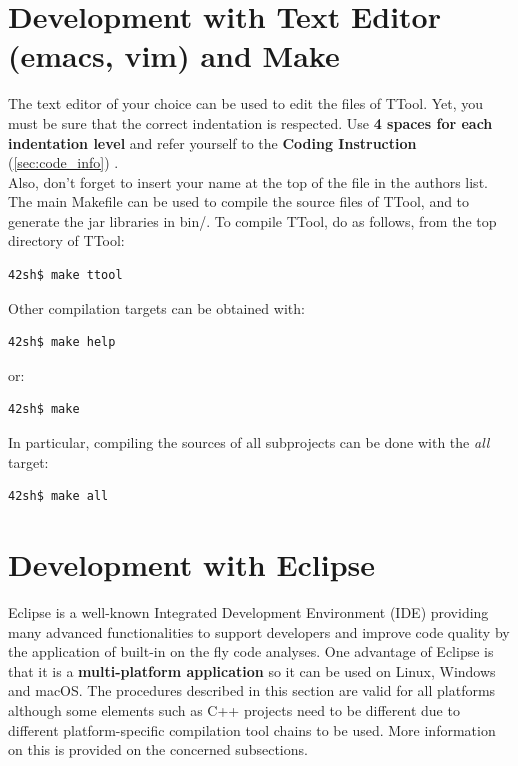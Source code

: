 \documentclass[12pt]{article}
\begin{document}
\section{Development with Text Editor (emacs, vim) and Make}

The text editor of your choice can be used to edit the files of TTool. Yet, you must be sure that the correct indentation is respected. Use \textbf{4 spaces for each indentation level} and refer yourself to the \textbf{Coding Instruction} (\ref{sec:code_info}) .\\

Also, don't forget to insert your name at the top of the file in the authors list.\\

The main Makefile can be used to compile the source files of TTool, and to generate the jar libraries in bin/.
To compile TTool, do as follows, from the top directory of TTool:
\begin{verbatim}
42sh$ make ttool
\end{verbatim}

Other compilation targets can be obtained with:
\begin{verbatim}
42sh$ make help
\end{verbatim}
or:
\begin{verbatim}
42sh$ make
\end{verbatim}
In particular, compiling the sources of all subprojects can be done with the
\textit{all} target:
\begin{verbatim}
42sh$ make all
\end{verbatim}

\newpage

\section{Development with Eclipse}

Eclipse is a well-known Integrated Development Environment (IDE) providing many advanced functionalities to support developers and improve code quality by the application of built-in on the fly code analyses. One advantage of Eclipse is that it is a \textbf{multi-platform application} so it can be used on Linux, Windows and macOS. The procedures described in this section are valid for all platforms although some elements such as C++ projects need to be different due to different platform-specific compilation tool chains to be used. More information on this is provided on the concerned subsections.
\end{document}
